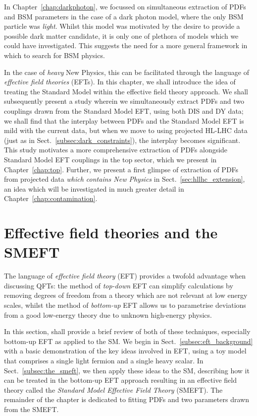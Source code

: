 \documentclass[withindex,glossary]{cam-thesis}
\begin{document}
\noindent In Chapter~\ref{chap:darkphoton}, we focussed on simultaneous extraction of PDFs and BSM parameters in the case of a dark photon model, where the only BSM particle was \textit{light}. Whilst this model was motivated by the desire to provide a possible dark matter candidate, it is only one of plethora of models which we could have investigated. This suggests the need for a more general framework in which to search for BSM physics.

In the case of \textit{heavy} New Physics, this can be facilitated through the language of \textit{effective field theories} (EFTs). In this chapter, we shall introduce the idea of treating the Standard Model within the effective field theory approach. We shall subsequently present a study wherein we simultaneously extract PDFs and two couplings drawn from the Standard Model EFT, using both DIS and DY data; we shall find that the interplay between PDFs and the Standard Model EFT is mild with the current data, but when we move to using projected HL-LHC data (just as in Sect.~\ref{subsec:dark_constraints}), the interplay becomes significant. This study motivates a more comprehensive extraction of PDFs alongside Standard Model EFT couplings in the top sector, which we present in Chapter~\ref{chap:top}. Further, we present a first glimpse of extraction of PDFs from projected data \textit{which contains New Physics} in Sect.~\ref{sec:hllhc_extension}, an idea which will be investigated in much greater detail in Chapter~\ref{chap:contamination}.

\section{Effective field theories and the SMEFT}
\label{sec:eft_intro}
The language of \textit{effective field theory} (EFT) provides a twofold advantage when discussing QFTs: the method of \textit{top-down} EFT can simplify calculations by removing degrees of freedom from a theory which are not relevant at low energy scales, whilst the method of \textit{bottom-up} EFT allows us to parametrise deviations from a good low-energy theory due to unknown high-energy physics. 

In this section, shall provide a brief review of both of these techniques, especially bottom-up EFT as applied to the SM. We begin in Sect.~\ref{subsec:eft_background} with a basic demonstration of the key ideas involved in EFT, using a toy model that comprises a single light fermion and a single heavy scalar. In Sect.~\ref{subsec:the_smeft}, we then apply these ideas to the SM, describing how it can be treated in the bottom-up EFT approach resulting in an effective field theory called the \textit{Standard Model Effective Field Theory} (SMEFT). The remainder of the chapter is dedicated to fitting PDFs and two parameters drawn from the SMEFT.
\end{document}
